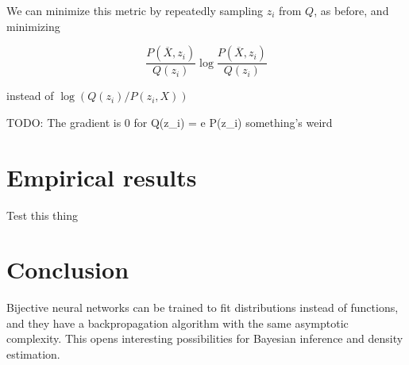 \documentclass{article}
\begin{document}
We can minimize this metric by repeatedly sampling \(z_i\) from \(Q\),
as before, and minimizing

\[
  \frac{P(\overline{X}, z_i)}{Q(z_i)} \log \frac{P(\overline{X}, z_i)}{Q(z_i)}
\]

instead of \(\log(Q(z_i)/P(z_i, X))\)

TODO: The gradient is 0 for Q(z_i) = e P(z_i) something's weird


\section{Empirical results}

Test this thing


\section{Conclusion}

Bijective neural networks can be trained to fit distributions instead of
functions, and they have a backpropagation algorithm with the same asymptotic
complexity. This opens interesting possibilities for Bayesian inference and
density estimation.
\end{document}

